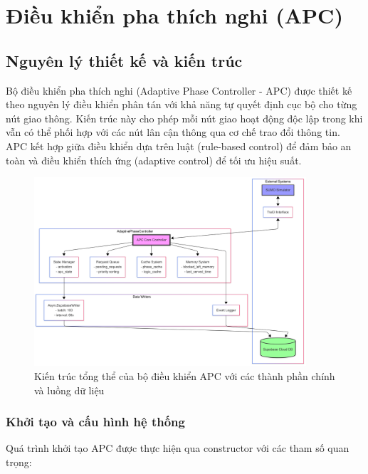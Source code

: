 \chapter{Điều khiển pha thích nghi (APC)}

\section{Nguyên lý thiết kế và kiến trúc}

Bộ điều khiển pha thích nghi (Adaptive Phase Controller - APC) được thiết kế theo nguyên lý điều khiển phân tán với khả năng tự quyết định cục bộ cho từng nút giao thông. Kiến trúc này cho phép mỗi nút giao hoạt động độc lập trong khi vẫn có thể phối hợp với các nút lân cận thông qua cơ chế trao đổi thông tin. APC kết hợp giữa điều khiển dựa trên luật (rule-based control) để đảm bảo an toàn và điều khiển thích ứng (adaptive control) để tối ưu hiệu suất.

\begin{figure}[H]
    \centering
    \includegraphics[width=0.9\textwidth]{Untitled diagram _ Mermaid Chart-2025-08-21-074754.png}
    \caption{Kiến trúc tổng thể của bộ điều khiển APC với các thành phần chính và luồng dữ liệu}
    \label{fig:apc_architecture}
\end{figure}

\subsection{Khởi tạo và cấu hình hệ thống}

Quá trình khởi tạo APC được thực hiện qua constructor với các tham số quan trọng:

